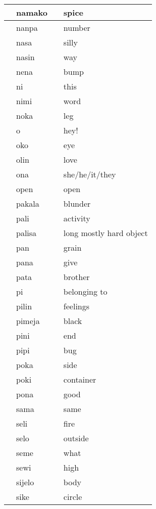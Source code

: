 \begin{table}
\begin{tabular}{|l|l|l|l|}
         & namako &  & spice \\ \hline
        ️ & nanpa &  & number \\ \hline
         & nasa &  & silly \\ \hline
         & nasin &  & way \\ \hline
         & nena &  & bump \\ \hline
         & ni &  & this \\ \hline
         & nimi &  & word \\ \hline
         & noka &  & leg \\ \hline
         & o &  & hey! \\ \hline
         & oko &  & eye \\ \hline
         & olin &  & love \\ \hline
         & ona &  & she/he/it/they \\ \hline
         & open &  & open \\ \hline
         & pakala &  & blunder \\ \hline
         & pali &  & activity \\ \hline
         & palisa &  & long mostly hard object \\ \hline
         & pan &  & grain \\ \hline
         & pana &  & give \\ \hline
         & pata &  & brother \\ \hline
         & pi &  & belonging to \\ \hline
         & pilin &  & feelings \\ \hline
         & pimeja &  & black \\ \hline
         & pini &  & end \\ \hline
         & pipi &  & bug \\ \hline
         & poka &  & side \\ \hline
         & poki &  & container \\ \hline
         & pona &  & good \\ \hline
         & sama &  & same \\ \hline
         & seli &  & fire \\ \hline
         & selo &  & outside \\ \hline
         & seme &  & what \\ \hline
         & sewi &  & high \\ \hline
         & sijelo &  & body \\ \hline
         & sike &  & circle \\ \hline

\end{tabular}
\end{table}
